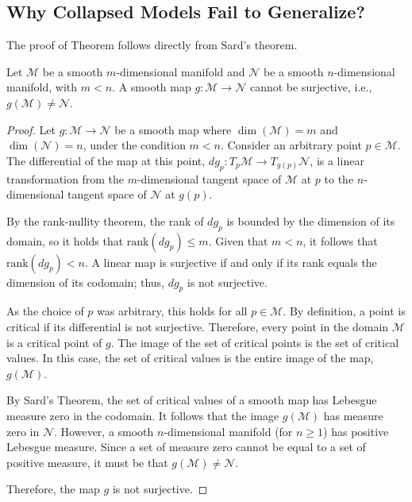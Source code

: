 \subsection{Why Collapsed Models Fail to Generalize?}
\label{appx:non_surjectivity}
The proof of Theorem follows directly from Sard's theorem. 

\begin{theorem}
Let $\mathcal{M}$ be a smooth $m$-dimensional manifold and $\mathcal{N}$ be a smooth $n$-dimensional manifold, with $m < n$. A smooth map $g: \mathcal{M} \to \mathcal{N}$ cannot be surjective, i.e., $g(\mathcal{M}) \neq \mathcal{N}$.
\end{theorem}

\begin{proof}
Let $g: \mathcal{M} \to \mathcal{N}$ be a smooth map where $\dim(\mathcal{M}) = m$ and $\dim(\mathcal{N}) = n$, under the condition $m < n$. Consider an arbitrary point $p \in \mathcal{M}$. The differential of the map at this point, $dg_p: T_p\mathcal{M} \to T_{g(p)}\mathcal{N}$, is a linear transformation from the $m$-dimensional tangent space of $\mathcal{M}$ at $p$ to the $n$-dimensional tangent space of $\mathcal{N}$ at $g(p)$.

By the rank-nullity theorem, the rank of $dg_p$ is bounded by the dimension of its domain, so it holds that $\text{rank}(dg_p) \le m$. Given that $m < n$, it follows that $\text{rank}(dg_p) < n$. A linear map is surjective if and only if its rank equals the dimension of its codomain; thus, $dg_p$ is not surjective.

As the choice of $p$ was arbitrary, this holds for all $p \in \mathcal{M}$. By definition, a point is critical if its differential is not surjective. Therefore, every point in the domain $\mathcal{M}$ is a critical point of $g$. The image of the set of critical points is the set of {critical values}. In this case, the set of critical values is the entire image of the map, $g(\mathcal{M})$.

By Sard's Theorem, the set of critical values of a smooth map has Lebesgue measure zero in the codomain. It follows that the image $g(\mathcal{M})$ has measure zero in $\mathcal{N}$. However, a smooth $n$-dimensional manifold (for $n \ge 1$) has positive Lebesgue measure. Since a set of measure zero cannot be equal to a set of positive measure, it must be that $g(\mathcal{M}) \neq \mathcal{N}$.

Therefore, the map $g$ is not surjective.
\end{proof}


